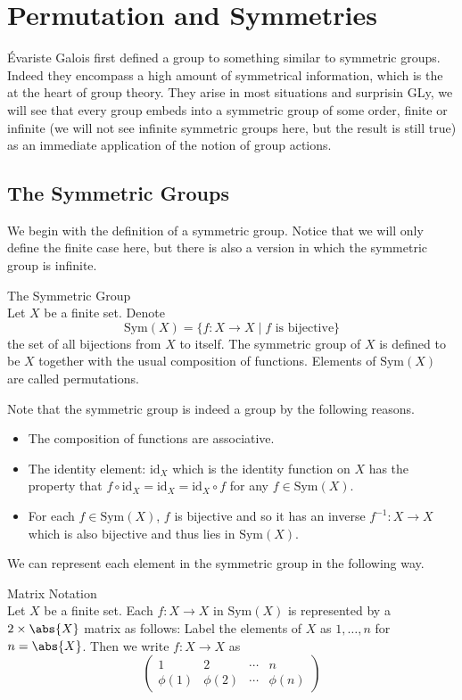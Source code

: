 \documentclass[a4paper]{article}
\begin{document}
\pagebreak
\section{Permutation and Symmetries}
Évariste Galois first defined a group to something similar to symmetric groups. Indeed they encompass a high amount of symmetrical information, which is the at the heart of group theory. They arise in most situations and surprisin GLy, we will see that every group embeds into a symmetric group of some order, finite or infinite (we will not see infinite symmetric groups here, but the result is still true) as an immediate application of the notion of group actions. 

\subsection{The Symmetric Groups}
We begin with the definition of a symmetric group. Notice that we will only define the finite case here, but there is also a version in which the symmetric group is infinite. 

\begin{defn}{The Symmetric Group}{}\\
Let $X$ be a finite set. Denote $$\text{Sym}(X)=\{f:X\to X\;|\; f\text{ is bijective}\}$$ the set of all bijections from $X$ to itself. The symmetric group of $X$ is defined to be $X$ together with the usual composition of functions. Elements of $\text{Sym}(X)$ are called permutations. 
\end{defn}

Note that the symmetric group is indeed a group by the following reasons. 
\begin{itemize}
\item The composition of functions are associative. 
\item The identity element: $\text{id}_X$ which is the identity function on $X$ has the property that $f\circ\text{id}_X=\text{id}_X=\text{id}_X\circ f$ for any $f\in\text{Sym}(X)$. 
\item For each $f\in\text{Sym}(X)$, $f$ is bijective and so it has an inverse $f^{-1}:X\to X$ which is also bijective and thus lies in $\text{Sym}(X)$. 
\end{itemize}

We can represent each element in the symmetric group in the following way. 

\begin{defn}{Matrix Notation}{}\\
Let $X$ be a finite set. Each $f:X\to X$ in $\text{Sym}(X)$ is represented by a $2\times\abs{X}$ matrix as follows: Label the elements of $X$ as $1,\dots,n$ for $n=\abs{X}$. Then we write $f:X\to X$ as $$\begin{pmatrix}
1 & 2 & \cdots & n\\
\phi(1) & \phi(2) & \cdots & \phi(n)
\end{pmatrix}$$
\end{defn}
\end{document}
